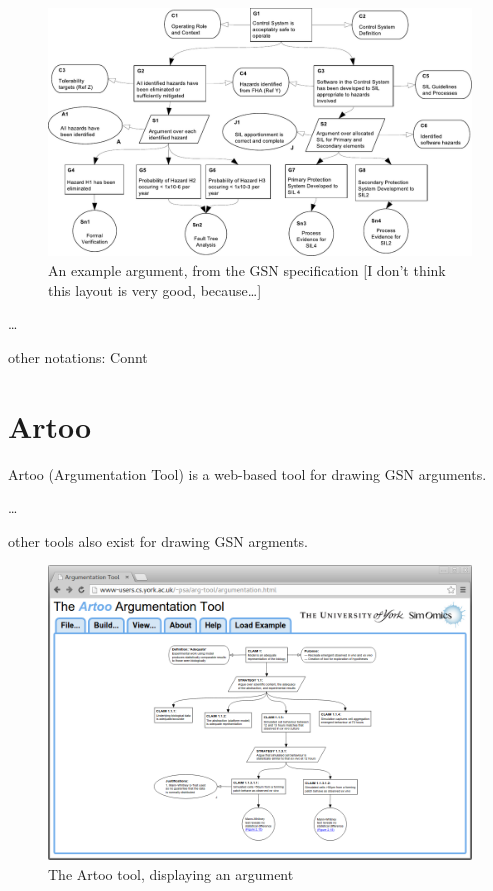 \documentclass[authoryearcitations]{UoYCSproject}
\begin{document}
\begin{figure}
    \centering
    \includegraphics[width=\textwidth]{example_argument.pdf}
    \caption{An example argument, from the GSN specification \cite{gsnstandard} [I don't think this layout is very good, because\ldots]    }
\end{figure}

\ldots

other notations: Connt

\section{Artoo}

Artoo (Argumentation Tool) is a web-based tool for drawing GSN arguments.

\ldots

other tools also exist for drawing GSN argments.

\begin{figure}
    \centering
    \includegraphics[width=\textwidth]{graphics/artoo_screenshot.png}
    \caption{The Artoo tool, displaying an argument }
\end{figure}
\end{document}
